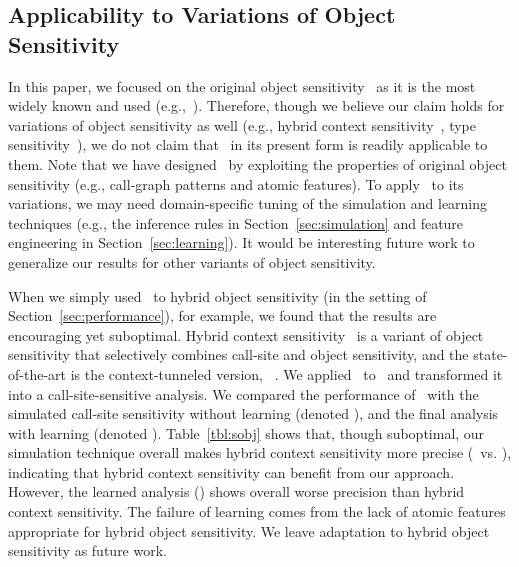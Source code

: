 



\subsection{Applicability to Variations of Object Sensitivity}

In this paper, we focused on the original object sensitivity~\cite{Milanova2002} as it is the most widely known and used (e.g.,~\cite{Li2018b,Li2018a,TanLX16,Smaragdakis2014,GordonKPGNR_NDSS15,Feng2014,Lu:2019:PYF,Li2018a}). 
Therefore, though we believe our claim holds for variations of object sensitivity as well (e.g., hybrid context sensitivity~\cite{KastrinisS13a}, type sensitivity~\cite{Smaragdakis2011}), we do not claim that \ourtechnique~in its present form is readily applicable to them. 
Note that we have designed \ourtechnique~by exploiting the properties of original object sensitivity (e.g., call-graph patterns and atomic features). To apply \ourtechnique~to its variations, we may need domain-specific tuning of the simulation and learning techniques (e.g., the inference rules in Section~\ref{sec:simulation} and feature engineering in Section~\ref{sec:learning}). 
It would be interesting future work to generalize our results for other variants of object sensitivity.


When we simply used \ourtechnique~to hybrid object sensitivity (in the setting of Section~\ref{sec:performance}), for example, we found that the results are encouraging yet suboptimal. 
Hybrid context sensitivity~\cite{KastrinisS13a} is a variant of object sensitivity that selectively combines call-site and object sensitivity, and the state-of-the-art is the context-tunneled version,  \onesobjHT~\cite{JeJeOh18}. 
We applied \ourtechnique~to \onesobjHT~and transformed it into a call-site-sensitive analysis. 
We compared the performance of \onesobjHT~with the simulated call-site sensitivity without learning (denoted \simonecallH), and the final analysis with learning (denoted \sobjSimLearn). 
Table~\ref{tbl:sobj} shows that, though suboptimal, our simulation technique overall makes hybrid context sensitivity more precise (\simonecallH~vs. \onesobjHT), indicating that hybrid context sensitivity can benefit from our approach. However, the learned analysis (\sobjSimLearn) shows overall worse precision than hybrid context sensitivity.  
The failure of learning comes from the lack of atomic features appropriate for hybrid object sensitivity. We leave adaptation to hybrid object sensitivity as future work. 


